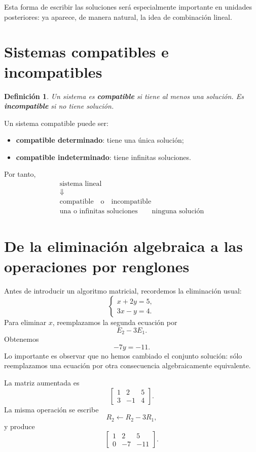 \documentclass[12pt]{article}
\newtheorem{definicion}{Definición}[section]
\theoremstyle{remark}
\begin{document}
Esta forma de escribir las soluciones será especialmente importante en unidades posteriores: ya
aparece, de manera natural, la idea de combinación lineal.

\section{Sistemas compatibles e incompatibles}

\begin{definicion}
Un sistema es \textbf{compatible} si tiene al menos una solución. Es \textbf{incompatible} si no tiene
solución.
\end{definicion}

Un sistema compatible puede ser:
\begin{itemize}
\item \textbf{compatible determinado}: tiene una única solución;
\item \textbf{compatible indeterminado}: tiene infinitas soluciones.
\end{itemize}

Por tanto,
\[
\boxed{
\begin{array}{c}
\text{sistema lineal}\\[1mm]
\Downarrow\\
\text{compatible}\quad\text{o}\quad\text{incompatible}\\
\text{una o infinitas soluciones}\qquad\text{ninguna solución}
\end{array}}
\]

\section{De la eliminación algebraica a las operaciones por renglones}

Antes de introducir un algoritmo matricial, recordemos la eliminación usual:
\[
\begin{cases}
x+2y=5,\\
3x-y=4.
\end{cases}
\]
Para eliminar $x$, reemplazamos la segunda ecuación por
\[
E_2-3E_1.
\]
Obtenemos
\[
-7y=-11.
\]
Lo importante es observar que no hemos cambiado el conjunto solución: sólo reemplazamos una ecuación
por otra consecuencia algebraicamente equivalente.

La matriz aumentada es
\[
\left[
\begin{array}{cc|c}
1&2&5\\
3&-1&4
\end{array}
\right].
\]
La misma operación se escribe
\[
R_2\leftarrow R_2-3R_1,
\]
y produce
\[
\left[
\begin{array}{cc|c}
1&2&5\\
0&-7&-11
\end{array}
\right].
\]
\end{document}
